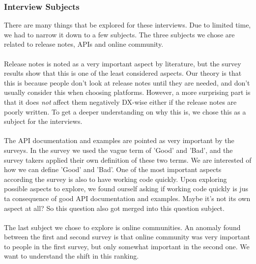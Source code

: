 \documentclass{article}
\begin{document}
\subsubsection{Interview Subjects}
There are many things that be explored for these interviews. Due to limited
time, we had to narrow it down to a few subjects. The three subjects
we chose are related to release notes, APIs and online community.
\\ \\
Release notes is noted as a very important aspect by literature, but
the survey results show that this is one of the least considered aspects.
Our theory is that this is because people don't look
at release notes until they are needed, and don't usually consider this
when choosing platforms. However, a more surprising part is that it does \textit{not}
affect them negatively DX-wise either if the release notes are poorly written.
To get a deeper understanding on why this is, we chose this as a subject
for the interviews.
\\ \\
The API documentation and examples are pointed as very important by the
surveys. In the survey we used the vague term of 'Good' and 'Bad', and
the survey takers applied their own definition of these two terms. We
are interested of how we can define 'Good' and 'Bad'. One of the most important
aspects according the survey is also to have working code quickly. Upon exploring
possible aspects to explore, we found ourself asking if working code quickly
is jus ta consequence of good API documentation and examples. Maybe it's not
its own aspect at all? So this question also got merged into this question subject.
\\ \\
The last subject we chose to explore is online communities. An anomaly found
between the first and second survey is that online community was very important
to people in the first survey, but only somewhat important in the second one.
We want to understand the shift in this ranking.
\end{document}
